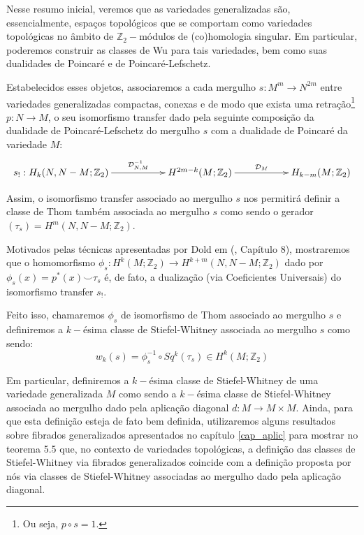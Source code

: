 \documentclass[12pt,oneside]{book} %
\newcommand{\Z}{\mathbb{Z}}
\newcommand{\ccup}{\smile}
\begin{document}
\par Nesse resumo inicial, veremos que as variedades generalizadas são, essencialmente, espaços topológicos que se comportam como variedades topológicas no âmbito de $\Z_{2}-$módulos de (co)homologia singular. Em particular, poderemos construir as classes de Wu para tais variedades, bem como suas dualidades de Poincaré e de Poincaré-Lefschetz.

\par Estabelecidos esses objetos, associaremos a cada mergulho $s:M^{m}\to N^{2m}$ entre variedades generalizadas compactas, conexas e de modo que exista uma retração\footnote{Ou seja, $p\circ s=1$.} $p:N\to M$, o seu isomorfismo transfer dado pela seguinte composição da dualidade de Poincaré-Lefschetz do mergulho $s$ com a dualidade de Poincaré da variedade $M$:
	$$ \xymatrix @C=0.5cm {
	s_{!}:H_{k}(N,N-M;\Z_{2}) \ar[rrr]^-{\mathcal{D}^{-1}_{N,M}} &&& H^{2m-k}(M;\Z_{2}) \ar[rrr]^-{\mathcal{D}_{M}} &&& H_{k-m}(M;\Z_{2})
} $$

\par Assim, o isomorfismo transfer associado ao mergulho $s$ nos permitirá definir a classe de Thom também associada ao mergulho $s$ como sendo o gerador $(\tau_{s})=H^{m}(N,N-M;\Z_{2})$.

\par Motivados pelas técnicas apresentadas por Dold em (\cite{dold}, Capítulo 8), mostraremos que o homomorfismo $\phi_{s}:H^{k}(M;\Z_{2})\to H^{k+m}(N,N-M;\Z_{2})$ dado por $\phi_{s}(x)=p^{*}(x)\ccup \tau_{s}$ é, de fato, a dualização (via Coeficientes Universais) do isomorfismo transfer $s_{!}$.

\par Feito isso, chamaremos $\phi_{s}$ de isomorfismo de Thom associado ao mergulho $s$ e definiremos a $k-$ésima classe de Stiefel-Whitney associada ao mergulho $s$ como sendo:
	$$ w_{k}(s)=\phi_{s}^{-1}\circ Sq^{k}(\tau_{s})\in H^{k}(M;\Z_{2}) $$

\par Em particular, definiremos a $k-$ésima classe de Stiefel-Whitney de uma variedade generalizada $M$ como sendo a $k-$ésima classe de Stiefel-Whitney associada ao mergulho dado pela aplicação diagonal $d:M\to M\times M$. Ainda, para que esta definição esteja de fato bem definida, utilizaremos alguns resultados sobre fibrados generalizados apresentados no capítulo \ref{cap_aplic} para mostrar no teorema 5.5 que, no contexto de variedades topológicas, a definição das classes de Stiefel-Whitney via fibrados generalizados coincide com a definição proposta por nós via classes de Stiefel-Whitney associadas ao mergulho dado pela aplicação diagonal.
\end{document}

